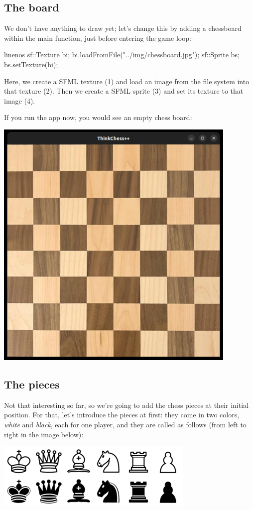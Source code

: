 \subsection{The board}
We don't have anything to draw yet; let's change this by adding a chessboard
within the main function, just before entering the game loop:

\begin{cpp*}{linenos}
  sf::Texture bi;
  bi.loadFromFile("../img/chessboard.jpg");
  sf::Sprite bs;
  bs.setTexture(bi);
\end{cpp*}

Here, we create a SFML texture (1) and load an image from the file system into that texture (2).
Then we create a SFML sprite (3) and set its texture  to that image (4).

If you run the app now, you would see an empty chess board:

\begin{center}
\includegraphics[width=.5\linewidth]{img/emptyBoard.jpg}
\end{center}

\subsection{The pieces}
Not that interesting so far, so we're going to add the chess pieces at their initial position.
For that, let's introduce the pieces at first: they come in two colors, \emph{white}
and \emph{black}, each for one player, and they are called as follows
(from left to right in the image below):

\begin{center}
\includegraphics[width=.5\linewidth]{../img/figures.png}
\end{center}

